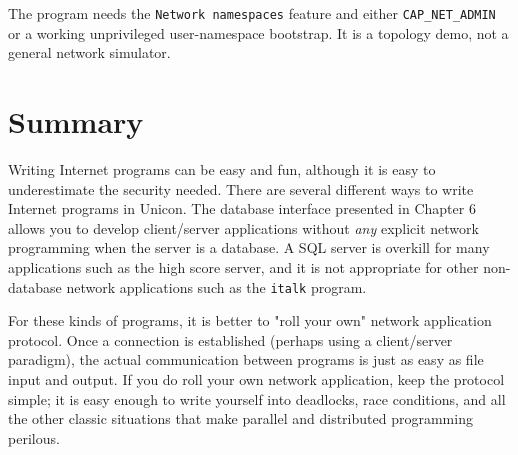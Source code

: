 
The program needs the \texttt{Network namespaces} feature and either
\texttt{CAP\_NET\_ADMIN} or a working unprivileged user-namespace
bootstrap. It is a topology demo, not a general network simulator.

\section{Summary}

Writing Internet programs can be easy and fun, although it is easy to
underestimate the security needed. There are several
different ways to write Internet programs in Unicon. The
database interface presented in Chapter 6 allows you to
develop client/server applications without \textit{any} explicit
network programming when the server is a database. A SQL
server is overkill for many applications such as the high score server,
and it is not appropriate for other non-database network applications
such as the \texttt{italk} program.

For these kinds of programs, it is better to "roll your
own" network application protocol. Once a connection is
established (perhaps using a client/server paradigm), the actual
communication between programs is just as easy as file input and
output. If you do roll your own network application, keep the protocol
simple; it is easy enough to write yourself into deadlocks, race
conditions, and all the other classic situations that make parallel and
distributed programming perilous.

